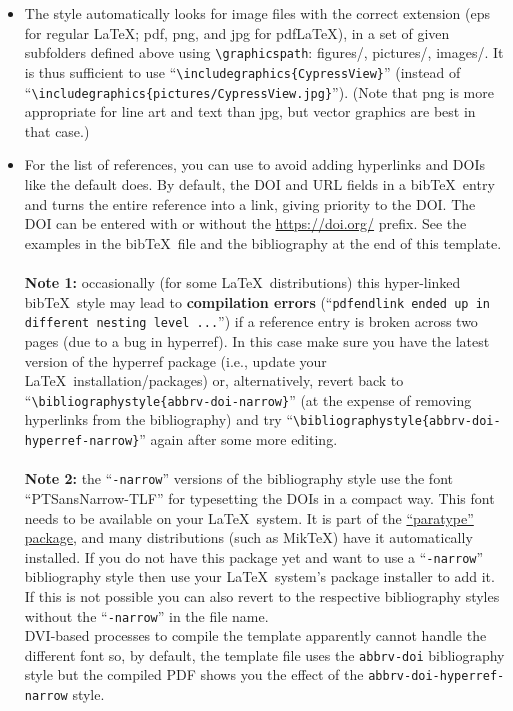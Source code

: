 \documentclass[widereview]{vgtc}             %
\begin{document}
\begin{itemize}
	\item The style automatically looks for image files with the correct extension (eps for regular \LaTeX; pdf, png, and jpg for pdf\LaTeX), in a set of given subfolders defined above using \texttt{\textbackslash graphicspath}: figures/, pictures/, images/.
		It is thus sufficient to use ``\texttt{\textbackslash includegraphics\{CypressView\}}'' (instead of ``\texttt{\textbackslash includegraphics\{pictures/CypressView.jpg\}}'').
		(Note that png is more appropriate for line art and text than jpg, but vector graphics are best in that case.)
	
	\item For the list of references, you can use \verb|| to avoid adding hyperlinks and DOIs like the default \verb|| does.
		By default, the DOI and URL fields in a bib\TeX\ entry and turns the entire reference into a link, giving priority to the DOI.
		The DOI can be entered with or without the \url{https://doi.org/} prefix.
		See the examples in the bib\TeX\ file and the bibliography at the end of this template.\\\\
		\textbf{Note 1:} occasionally (for some \LaTeX\ distributions) this hyper-linked bib\TeX\ style may lead to \textbf{compilation errors} (``\texttt{pdfendlink ended up in different nesting level ...}'') if a reference entry is broken across two pages (due to a bug in hyperref).
		In this case make sure you have the latest version of the hyperref package (i.e., update your \LaTeX\ installation/packages) or, alternatively, revert back to ``\texttt{\textbackslash bibliographystyle\{abbrv-doi-narrow\}}'' (at the expense of removing hyperlinks from the bibliography) and try ``\texttt{\textbackslash bibliographystyle\{abbrv-doi-hyperref-narrow\}}'' again after some more editing.\\\\
		\textbf{Note 2:} the ``\texttt{-narrow}'' versions of the bibliography style use the font ``PTSansNarrow-TLF'' for typesetting the DOIs in a compact way.
		This font needs to be available on your \LaTeX\ system.
		It is part of the \href{https://www.ctan.org/pkg/paratype}{``paratype'' package}, and many distributions (such as MikTeX) have it automatically installed.
		If you do not have this package yet and want to use a ``\texttt{-narrow}'' bibliography style then use your \LaTeX\ system's package installer to add it.
		If this is not possible you can also revert to the respective bibliography styles without the ``\texttt{-narrow}'' in the file name.\\[1em]
		DVI-based processes to compile the template apparently cannot handle the different font so, by default, the template file uses the \texttt{abbrv-doi} bibliography style but the compiled PDF shows you the effect of the \texttt{abbrv-doi-hyperref-narrow} style.
\end{itemize}
\end{document}
